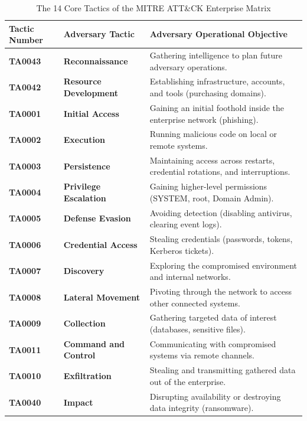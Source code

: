 \begin{table}[htbp]
\centering
\caption{The 14 Core Tactics of the MITRE ATT\&CK Enterprise Matrix}
\label{tab:mitre_tactics}
\begin{tabularx}{\textwidth}{l p{4.2cm} X}
\toprule
\textbf{Tactic Number} & \textbf{Adversary Tactic} & \textbf{Adversary Operational Objective} \\
\midrule
\textbf{TA0043} & \textbf{Reconnaissance} & Gathering intelligence to plan future adversary operations. \\
\textbf{TA0042} & \textbf{Resource Development} & Establishing infrastructure, accounts, and tools (purchasing domains). \\
\textbf{TA0001} & \textbf{Initial Access} & Gaining an initial foothold inside the enterprise network (phishing). \\
\textbf{TA0002} & \textbf{Execution} & Running malicious code on local or remote systems. \\
\textbf{TA0003} & \textbf{Persistence} & Maintaining access across restarts, credential rotations, and interruptions. \\
\textbf{TA0004} & \textbf{Privilege Escalation} & Gaining higher-level permissions (SYSTEM, root, Domain Admin). \\
\textbf{TA0005} & \textbf{Defense Evasion} & Avoiding detection (disabling antivirus, clearing event logs). \\
\textbf{TA0006} & \textbf{Credential Access} & Stealing credentials (passwords, tokens, Kerberos tickets). \\
\textbf{TA0007} & \textbf{Discovery} & Exploring the compromised environment and internal networks. \\
\textbf{TA0008} & \textbf{Lateral Movement} & Pivoting through the network to access other connected systems. \\
\textbf{TA0009} & \textbf{Collection} & Gathering targeted data of interest (databases, sensitive files). \\
\textbf{TA0011} & \textbf{Command and Control} & Communicating with compromised systems via remote channels. \\
\textbf{TA0010} & \textbf{Exfiltration} & Stealing and transmitting gathered data out of the enterprise. \\
\textbf{TA0040} & \textbf{Impact} & Disrupting availability or destroying data integrity (ransomware). \\
\bottomrule
\end{tabularx}
\end{table}

